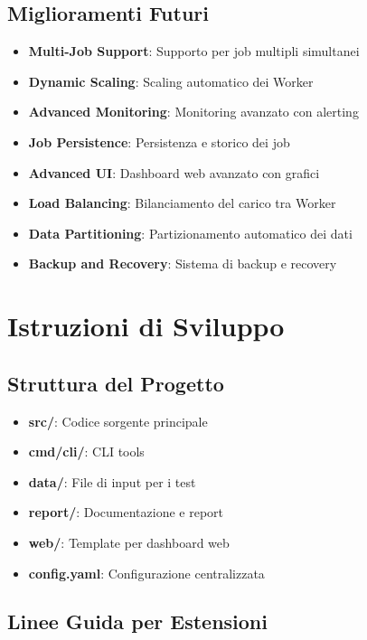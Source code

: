 \documentclass[12pt,a4paper]{article}
\begin{document}
\subsection{Miglioramenti Futuri}

\begin{itemize}
\item \textbf{Multi-Job Support}: Supporto per job multipli simultanei
\item \textbf{Dynamic Scaling}: Scaling automatico dei Worker
\item \textbf{Advanced Monitoring}: Monitoring avanzato con alerting
\item \textbf{Job Persistence}: Persistenza e storico dei job
\item \textbf{Advanced UI}: Dashboard web avanzato con grafici
\item \textbf{Load Balancing}: Bilanciamento del carico tra Worker
\item \textbf{Data Partitioning}: Partizionamento automatico dei dati
\item \textbf{Backup and Recovery}: Sistema di backup e recovery
\end{itemize}

\section{Istruzioni di Sviluppo}

\subsection{Struttura del Progetto}

\begin{itemize}
\item \textbf{src/}: Codice sorgente principale
\item \textbf{cmd/cli/}: CLI tools
\item \textbf{data/}: File di input per i test
\item \textbf{report/}: Documentazione e report
\item \textbf{web/}: Template per dashboard web
\item \textbf{config.yaml}: Configurazione centralizzata
\end{itemize}

\subsection{Linee Guida per Estensioni}
\end{document}
